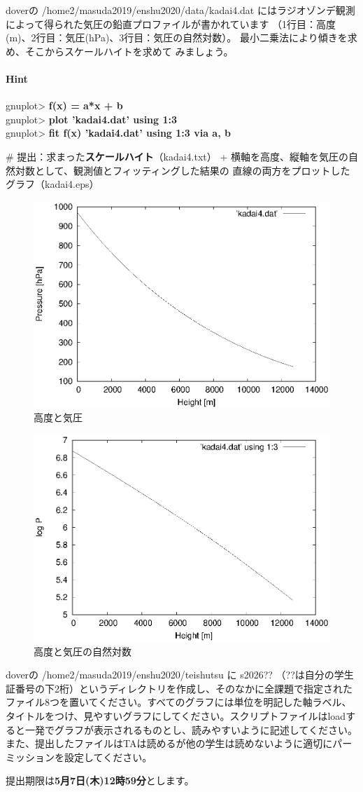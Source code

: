 \documentclass[a4j]{ujarticle} %
\newenvironment{terminal}{%
  \begin{center}
   \begin{minipage}{.8\textwidth}
    \setlength{\FrameSep}{.5\FrameSep}%
    \begin{framed}\ttfamily\small%
     \setlength\baselineskip{.85\baselineskip}%
}{%
    \end{framed}
   \end{minipage}
  \end{center}%
}
\begin{document}
\begin{enumerate}
doverの /home2/masuda2019/enshu2020/data/kadai4.dat にはラジオゾンデ観測によって得られた気圧の鉛直プロファイルが書かれています
（1行目：高度(m)、2行目：気圧(hPa)、3行目：気圧の自然対数）。
最小二乗法により傾きを求め、そこからスケールハイトを求めて
みましょう。

\paragraph{Hint}

\begin{terminal}
 gnuplot> {\bf f(x) = a*x + b} \\  
 gnuplot> {\bf plot 'kadai4.dat' using 1:3} \\
 gnuplot> {\bf fit f(x) 'kadai4.dat' using 1:3 via a, b}
\end{terminal}

\# 提出：求まった\textbf{スケールハイト}（kadai4.txt）
     + 横軸を高度、縦軸を気圧の自然対数として、観測値とフィッティングした結果の
     直線の両方をプロットしたグラフ（kadai4.eps）

\newpage
\begin{figure}[h]
 \begin{center}
  \includegraphics[width=0.6\hsize]{kadai4-1.eps}
  \caption{高度と気圧}
 \end{center}
\end{figure}

\begin{figure}[h]
 \begin{center}
  \includegraphics[width=0.6\hsize]{kadai4-2.eps}
  \caption{高度と気圧の自然対数}
 \end{center}
\end{figure}

\end{enumerate}
doverの /home2/masuda2019/enshu2020/teishutsu に s2026?? （??は自分の学生証番号の下2桁）というディレクトリを作成し、そのなかに全課題で指定されたファイル8つを置いてください。すべてのグラフには単位を明記した軸ラベル、タイトルをつけ、見やすいグラフにしてください。スクリプトファイルはloadすると一発でグラフが表示されるものとし、読みやすいように記述してください。また、提出したファイルはTAは読めるが他の学生は読めないように適切にパーミッションを設定してください。

提出期限は\textbf{5月7日(木)12時59分}とします。
\end{document}
